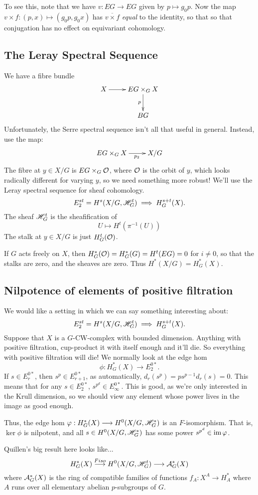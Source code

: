 \documentclass[11pt]{article}
\begin{document}
\begin{JeremyQuillenPractice}
To see this, note that we have $v:EG\to EG$ given by $p\mapsto g_0p$. Now the map $v\times f:(p,x)\mapsto(g_0p,g_0x)$ has $\overline{v\times f}$ \emph{equal} to the identity, so that so that conjugation has no effect on equivariant cohomology.
\subsection*{The Leray Spectral Sequence}
We have a fibre bundle
\[\xymatrix{
X\ar[r]&EG\times_G X\ar[d]_p\\
&BG
}\]
Unfortunately, the Serre spectral sequence isn't all that useful in general. Instead, use the map:
\[\xymatrix{
EG\times_G X\ar[r]_{\ \ \ p_2}&X/G
}\]
The fibre at $y\in X/G$ is $EG\times_G\mathcal{O}$, where $\mathcal{O}$ is the orbit of $y$, which looks radically different for varying $y$, so we need something more robust! We'll use the Leray spectral sequence for sheaf cohomology.
\[E_2^{st}=H^s(X/G,\mathscr{H}_G^t)\implies H_G^{s+t}(X).\]
The sheaf $\mathscr{H}_G^t$ is the sheafification of
\[U\mapsto H^t(\pi^{-1}(U))\]
The stalk at $y\in X/G$ is just $H^t_G(\mathcal{O})$.
\begin{exmp*}
If $G$ acts freely on $X$, then $H_G^*(\mathcal{O})=H_G^*(G)=H^t(EG)=0$ for $i\neq0$, so that the stalks are zero, and the sheaves are zero. Thus $H^*(X/G)=H_G^*(X)$.
\end{exmp*}
\subsection*{Nilpotence of elements of positive filtration}
We would like a setting in which we can say something interesting about:
\[E_2^{st}=H^s(X/G,\mathscr{H}_G^t)\implies H_G^{s+t}(X).\]
Suppose that $X$ is a $G$-CW-complex with bounded dimension. Anything with positive filtration, cup-product it with itself enough and it'll die. So everything with positive filtration will die! We normally look at the edge hom
\[\phi:H^*_G(X)\to E^{0*}_2.\]
If $s\in E_r^{0*}$, then $s^p\in E_{r+1}^{0*}$, as automatically, $d_r(s^p)=ps^{p-1} d_r(s)=0$. This means that for any $s\in E_2^{0*}$, $s^{p^d}\in E_\infty^{0*}$. This is good, as we're only interested in the Krull dimension, so we should view any element whose power lives in the image as good enough.

Thus, the edge hom $\varphi:H^*_G(X)\longrightarrow H^0(X/G,\mathscr{H}^*_G)$ is an $F$-isomorphism. That is, $\ker\phi$ is nilpotent, and all $s\in H^0(X/G,\mathscr{H}^*_G)$ has some power $s^{p^d}\in\operatorname{im}\varphi$.

Quillen's big result here looks like...
\[H^*_G(X)\overset{Fiso}{\longrightarrow} H^0(X/G,\mathscr{H}_G^t)\longrightarrow \mathcal{A}_G^*(X)\]
where $\mathcal{A}_G^*(X)$ is the ring of compatible families of functions $f_A:X^A\to H^*_A$ where $A$ runs over all elementary abelian $p$-subgroups of $G$.


\end{JeremyQuillenPractice}
\end{document}
